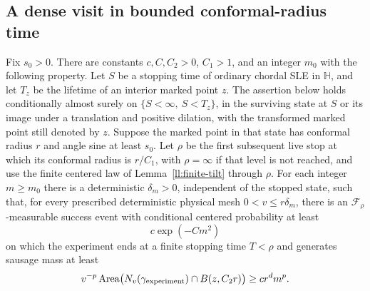 \subsection{A dense visit in bounded conformal-radius time}

\begin{proposition}\label{rc:dense}
Fix $s_0>0$. There are constants $c,C,C_2>0$, $C_1>1$, and an integer
$m_0$ with the following property. Let $S$ be a stopping time of ordinary
chordal SLE in $\mathbb H$, and let $T_z$ be the lifetime of an interior
marked point $z$. The assertion below holds conditionally almost surely
on $\{S<\infty,\ S<T_z\}$, in the surviving state at $S$ or its image
under a translation and positive dilation, with the transformed marked
point still denoted by $z$.
Suppose the marked point in that state has conformal radius $r$ and angle
sine at least $s_0$. Let $\rho$ be the first subsequent live stop at which
its conformal radius is $r/C_1$, with $\rho=\infty$ if that level is not
reached, and use the finite centered law of Lemma~\ref{ll:finite-tilt}
through $\rho$. For each integer $m\ge m_0$ there is a deterministic
$\delta_m>0$, independent of the stopped state, such that, for every
prescribed deterministic physical mesh $0<v\le r\delta_m$, there is an
$\mathcal F_\rho$-measurable success event with conditional centered
probability at least
\begin{equation}\label{rc:dense-probability}
 c\exp(-Cm^2)
\end{equation}
on which the experiment ends at a finite stopping time $T<\rho$ and
generates sausage mass at least
\begin{equation}\label{rc:dense-mass}
 v^{-p}\operatorname{Area}
  \bigl(N_v(\gamma_{\rm experiment})\cap B(z,C_2r)\bigr)
       \ge c r^d m^p.
\end{equation}
\end{proposition}

